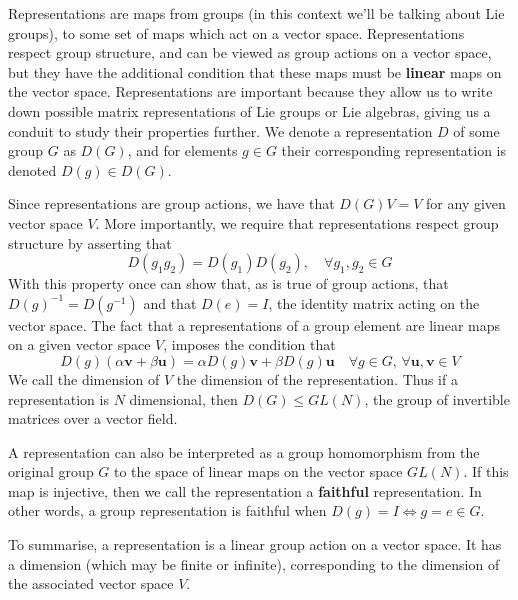 \documentclass[11pt, oneside]{article}   	%
\theoremstyle{slanted}
\begin{document}
Representations are maps from groups (in this context we'll be talking about Lie groups), to some set of maps which act on a vector space. Representations respect group structure, and can be viewed as group actions on a vector space, but they have the additional condition that these maps must be \textbf{linear} maps on the vector space. Representations are important because they allow us to write down possible matrix representations of Lie groups or Lie algebras, giving us a conduit to study their properties further. We denote a representation $D$ of some group $G$ as $D(G)$, and for elements $g \in G $ their corresponding representation is denoted $D(g) \in D(G)$. 

Since representations are group actions, we have that $D(G) V = V $ for any given vector space $V $. More importantly, we require that representations respect group structure by asserting that
\[
D(g_1 g_2) = D(g_1)D(g_2), \quad \forall g_1, g_2 \in G  
\]
With this property once can show that, as is true of group actions, that $D(g)^{-1} = D(g^{-1}) $ and that $D( e) = I$, the identity matrix acting on the vector space. 
The fact that a representations of a group element are linear maps on a given vector space $V$, imposes the condition that \[ D(g)(\alpha \mathbf{v} + \beta \mathbf{u} ) = \alpha D(g) \mathbf{v} + \beta D(g) \mathbf{u} \quad  \forall g \in G, \, \forall \mathbf{u}, \mathbf{v} \in V \] 
We call the dimension of $V$ the dimension of the representation. Thus if a representation is $N$ dimensional, then $D( G) \leq GL(N ) $, the group of invertible matrices over a vector field. 

A representation can also be interpreted as a group homomorphism from the original group $G$ to the space of linear maps on the vector space $GL (N) $. If this map is injective, then we call the representation a \textbf{ faithful } representation. In other words, a group representation is faithful when $D(g) = I \iff g = e \in G$. 

To summarise, a representation is a linear group action on a vector space. It has a dimension (which may be finite or infinite), corresponding to the dimension of the associated vector space $V$. 
\end{document}
